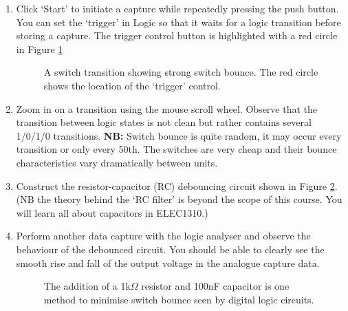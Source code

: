 \documentclass{UoNMCHA}
\numberwithin{equation}{section}
\begin{document}
\begin{enumerate}
    \item Click `Start' to initiate a capture while repeatedly pressing the push button. You can set the `trigger' in Logic so that it waits for a logic transition before storing a capture. The trigger control button is highlighted with a red circle in Figure \ref{fig:swbounce}
    
    \begin{figure}[H]
    \caption{A switch transition showing strong switch bounce. The red circle shows the location of the `trigger' control.}
    \label{fig:swbounce}
    \end{figure}
    
    \item Zoom in on a transition using the mouse scroll wheel. Observe that the transition between logic states is not clean but rather contains several 1/0/1/0 transitions. \textbf{NB:} Switch bounce is quite random, it may occur every transition or only every 50th. The switches are very cheap and their bounce characteristics vary dramatically between units.
    
    \item Construct the resistor-capacitor (RC) debouncing circuit shown in Figure \ref{fig:rcswsch}. (NB the theory behind the `RC filter' is beyond the scope of this course. You will learn all about capacitors in ELEC1310.)
    
    \item Perform another data capture with the logic analyser and observe the behaviour of the debounced circuit. You should be able to clearly see the smooth rise and fall of the output voltage in the analogue capture data.
    
    \begin{figure}[H]
    \caption{The addition of a 1k$\Omega$ resistor and 100nF capacitor is one method to minimise switch bounce seen by digital logic circuits.}
    \label{fig:rcswsch}
    \end{figure}
\end{enumerate}
\end{document}
